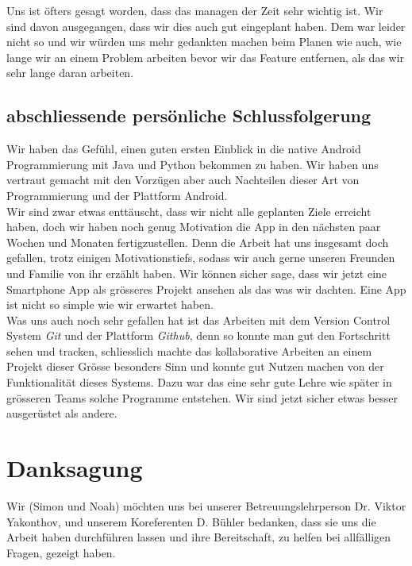 \documentclass[a4paper,11pt]{article}
\begin{document}
Uns ist öfters gesagt worden, dass das managen der Zeit sehr wichtig ist. Wir sind davon ausgegangen, dass wir dies auch gut eingeplant haben. Dem war leider nicht so und wir 
würden uns mehr gedankten machen beim Planen wie auch, wie lange wir an einem Problem arbeiten bevor wir das Feature entfernen, als das wir sehr lange daran arbeiten. 


\subsection{abschliessende persönliche Schlussfolgerung}
Wir haben das Gefühl, einen guten ersten Einblick in die native Android Programmierung mit Java und Python bekommen zu haben. Wir haben uns vertraut gemacht mit den Vorzügen aber auch Nachteilen dieser Art von Programmierung und der Plattform Android.\\

Wir sind zwar etwas enttäuscht, dass wir nicht alle geplanten Ziele erreicht haben, doch wir haben noch genug Motivation die App in den nächsten paar Wochen und Monaten fertigzustellen. Denn die Arbeit hat uns insgesamt doch gefallen, trotz einigen Motivationstiefs, sodass wir auch gerne unseren Freunden und Familie von ihr erzählt haben.
Wir können sicher sage, dass wir jetzt eine Smartphone App als grösseres Projekt ansehen als das was wir dachten. Eine App ist nicht so simple wie wir erwartet haben.\\

Was uns auch noch sehr gefallen hat ist das Arbeiten mit dem Version Control System \textit{Git} und der Plattform \textit{Github}, denn so konnte man gut den Fortschritt sehen und tracken, schliesslich machte das kollaborative Arbeiten an einem Projekt dieser Grösse besonders Sinn und konnte gut Nutzen machen von der Funktionalität dieses Systems.
Dazu war das eine sehr gute Lehre wie später in grösseren Teams solche Programme entstehen. Wir sind jetzt sicher etwas besser ausgerüstet als andere.

\section{Danksagung}
Wir (Simon und Noah) möchten uns bei unserer Betreuungslehrperson Dr. Viktor Yakonthov, und unserem Koreferenten D. Bühler bedanken, dass sie uns die Arbeit haben durchführen lassen und ihre Bereitschaft, zu helfen bei allfälligen Fragen, gezeigt haben.

\end{document}
